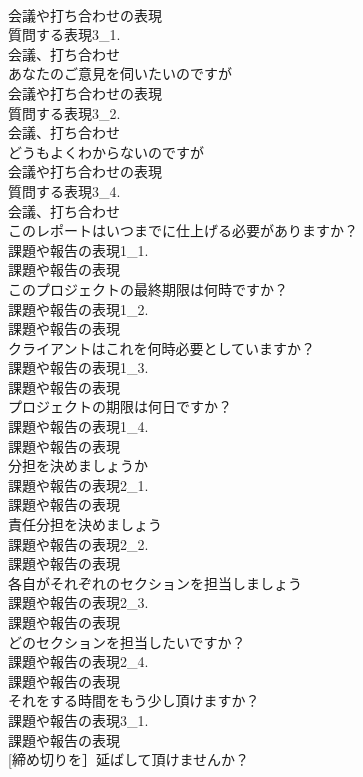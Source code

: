 \documentclass[8pt]{extreport}
\begin{document}
\begin{CJK}{UTF8}{min}
\\	会議や打ち合わせの表現
\\	質問する表現3_1.
\\	会議、打ち合わせ
\\	あなたのご意見を伺いたいのですが	
\\	会議や打ち合わせの表現
\\	質問する表現3_2.
\\	会議、打ち合わせ
\\	どうもよくわからないのですが	
\\	会議や打ち合わせの表現
\\	質問する表現3_4.
\\	会議、打ち合わせ
\\	このレポートはいつまでに仕上げる必要がありますか？	
\\	課題や報告の表現1_1.
\\	課題や報告の表現
\\	このプロジェクトの最終期限は何時ですか？	
\\	課題や報告の表現1_2.
\\	課題や報告の表現
\\	クライアントはこれを何時必要としていますか？	
\\	課題や報告の表現1_3.
\\	課題や報告の表現
\\	プロジェクトの期限は何日ですか？	
\\	課題や報告の表現1_4.
\\	課題や報告の表現
\\	分担を決めましょうか	
\\	課題や報告の表現2_1.
\\	課題や報告の表現
\\	責任分担を決めましょう	
\\	課題や報告の表現2_2.
\\	課題や報告の表現
\\	各自がそれぞれのセクションを担当しましょう	
\\	課題や報告の表現2_3.
\\	課題や報告の表現
\\	どのセクションを担当したいですか？	
\\	課題や報告の表現2_4.
\\	課題や報告の表現
\\	それをする時間をもう少し頂けますか？	
\\	課題や報告の表現3_1.
\\	課題や報告の表現
\\	[締め切りを］延ばして頂けませんか？	

\end{CJK}
\end{document}
